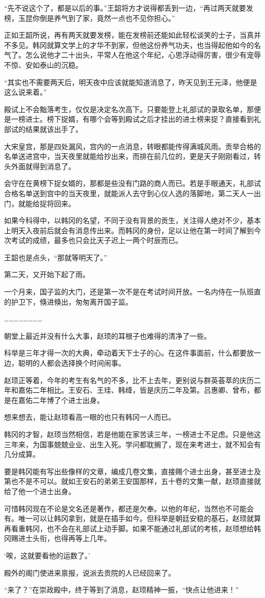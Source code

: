 “先不说这个了，都是以后的事。”王韶将方才说得都丢到一边，“再过两天就要发榜，玉昆你倒是养气到了家，竟然一点也不见你担心。”

正如王韶所说，再有两天就要发榜，能在发榜前还能如此轻松谈笑的士子，当真并不多见。韩冈就算文学上的才华不到家，但他这份养气功夫，也当得起他如今的名气了。怎么说他才二十出头，平常人在他这个年纪，心思浮动得厉害，很少有宠辱不惊、安如泰山的沉稳。

“其实也不需要两天后，明天夜中应该就能知道消息了，昨天见到王元泽，他便是这么说来着。”

殿试上不会黜落考生，仅仅是决定名次高下。只要能登上礼部试的录取名单，那便是一榜进士。榜下捉婿，有哪个会等到殿试之后才挂出的进士榜来捉？直接看到礼部试的结果就该出手了。

大宋皇宫，那是四处漏风，宫内的一点消息，转眼都能传得满城风雨。贡举合格的名单送进宫中，当天夜里就能给抄出来，而排在前几位的，更是天子刚刚看过，转头外面就得到消息了。

会守在在黄榜下捉女婿的，那都是些没有门路的商人而已。若是手眼通天，礼部试合格名单送到宫中的当天夜里，就能派人去守到心仪人选的落脚地，第二天人一出门，就能给捉将回来。

如果今科得中，以韩冈的名望，不同于没有背景的贡生，关注得人绝对不少，基本上明天入夜前后就会有消息传出来。而韩冈的身份，足以让他在第一时间了解到今次考试的成绩，最多也只会比天子迟上一两个时辰而已。

王韶也是点头，“那就等明天了。”

第二天，又开始下起了雨。

一个月来，国子监的大门，还是第一次不是在考试时间开放。一名内侍在一队班直的护卫下，倏进倏出，匆匆离开国子监。

……………………

朝堂上最近并没有什么大事，赵顼的耳根子也难得的清净了一些。

科举是三年才得一次的大典，牵动着天下士子的心。在这件事面前，什么都要放一边，聪明的人都会选择换个时间闹事。

赵顼正等着，今年的考生有名气的不多，比不上去年，更别说与群英荟萃的庆历二年和嘉佑二年相比。王安石、王珪、韩绛，皆是庆历二年及第。吕惠卿、曾布，都是在嘉佑二年博了个进士出身。

想来想去，能让赵顼看高一眼的也只有韩冈一人而已。

韩冈的才智，赵顼当然相信，若是他能在家苦读三年，一榜进士不足虑。只是他这三年来，为国事兢兢业业、出生入死。学问都耽搁了，现在来考进士，就不知会有几分成算。

要是韩冈能有写出些像样的文章，编成几卷文集，直接赐个进士出身，甚至进士及第也不是不可以。就如王安石的弟弟王安国那样，五十卷的文集一献，赵顼直接就给了他一个进士出身。

可惜韩冈现在不论是文名还是著作，都还是欠奉。以他的年纪，当然也不可能会有。唯一可以让韩冈拿到，就是在插手如今。但科举是朝廷安稳的基石，赵顼就算再看重韩冈，也不会在礼部试上动手脚。如果不能通过礼部试的考核，赵顼想给韩冈赐进士头衔，也得再等上几年。

‘唉，这就要看他的运数了。’

殿外的阁门使进来禀报，说派去贡院的人已经回来了。

“来了？”在崇政殿中，终于等到了消息，赵顼精神一振，“快点让他进来！”

